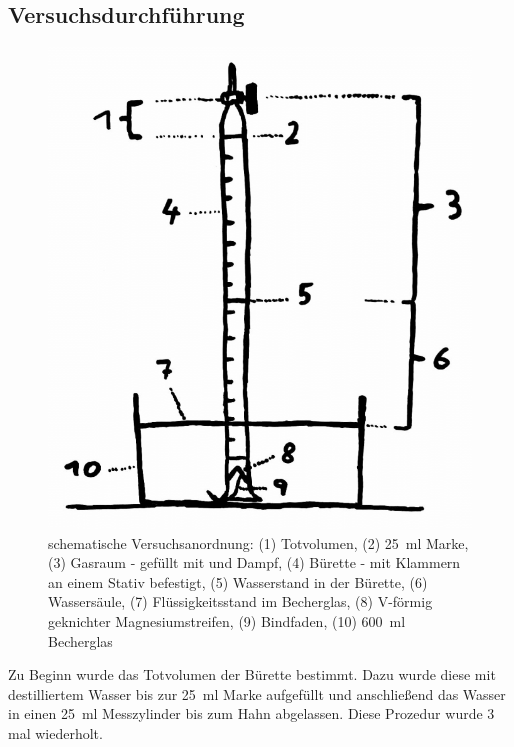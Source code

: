 \documentclass{article}
\begin{document}
    \subsection{Versuchsdurchführung} \label{sec:Versuch}
    
    \begin{figure}[h]
      \includegraphics[scale=0.3, center]{Graphiken/Versuchsanordnungen/VersuchsanordnungMagnesium.png} 
      \caption[schematische Versuchsanordnung, Quelle: Autor]{schematische Versuchsanordnung: (1) Totvolumen, (2) \SI[mode=text]{25}{\milli\litre} Marke, (3) Gasraum - gefüllt mit  und  Dampf, (4) Bürette - mit Klammern an einem Stativ befestigt, (5) Wasserstand in der Bürette, (6) Wassersäule, (7) Flüssigkeitsstand im Becherglas, (8) V-förmig geknichter Magnesiumstreifen, (9) Bindfaden, (10) \SI[mode=text]{600}{\milli\litre} Becherglas}
      \label{fig:Versuchsanordnung}
    \end{figure}
    
    Zu Beginn wurde das Totvolumen der Bürette bestimmt. Dazu wurde diese mit destilliertem Wasser bis zur \SI[mode=text]{25}{\milli\litre} Marke aufgefüllt und anschließend das Wasser in einen \SI[mode=text]{25}{\milli\litre} Messzylinder bis zum Hahn abgelassen. Diese Prozedur wurde 3 mal wiederholt.\\
    
\end{document}
